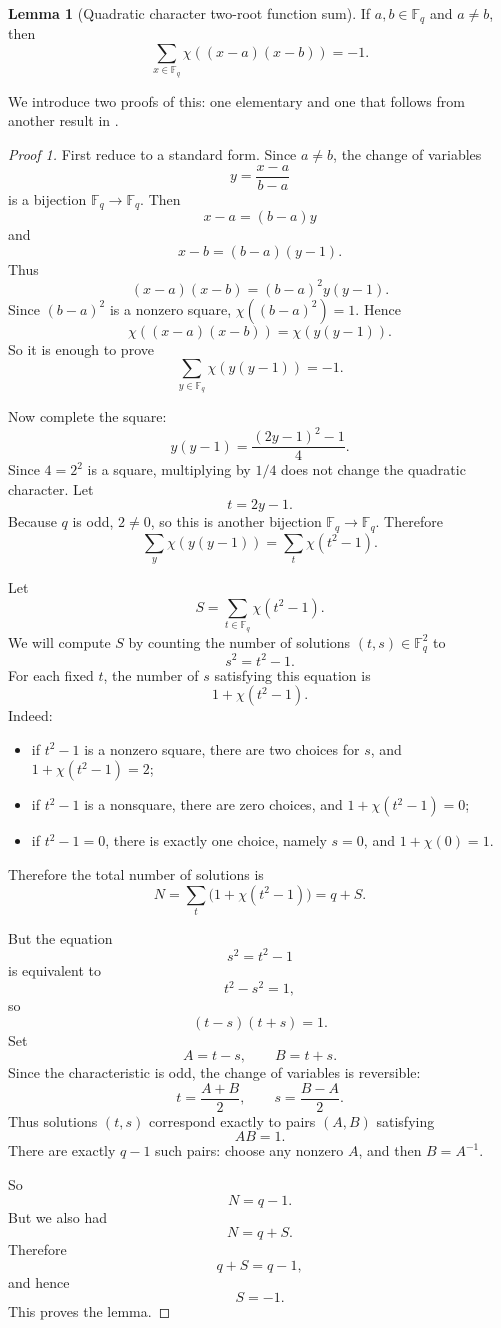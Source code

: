 \documentclass{article}
\newcommand{\F}{\mathbb F}
\theoremstyle{definition}
\newtheorem{lemma}{Lemma}
\numberwithin{equation}{section}
\begin{document}
\begin{lemma}[Quadratic character two-root function sum]
If \(a,b\in\F_q\) and \(a\neq b\), then
\[
\boxed{
\sum_{x\in\F_q}\chi((x-a)(x-b))=-1.
}
\]
\label{quadratic_sum}
\end{lemma}

We introduce two proofs of this: one elementary and one that follows from another result in \cite{LidlNiederreiterFiniteFields}.

\begin{proof}[Proof 1]
First reduce to a standard form. Since \(a\neq b\), the change of variables
\[
y=\frac{x-a}{b-a}
\]
is a bijection \(\F_q\to\F_q\). Then
\[
x-a=(b-a)y
\]
and
\[
x-b=(b-a)(y-1).
\]
Thus
\[
(x-a)(x-b)=(b-a)^2y(y-1).
\]
Since \((b-a)^2\) is a nonzero square, \(\chi((b-a)^2)=1\). Hence
\[
\chi((x-a)(x-b))=\chi(y(y-1)).
\]
So it is enough to prove
\[
\sum_{y\in\F_q}\chi(y(y-1))=-1.
\]

Now complete the square:
\[
y(y-1)=\frac{(2y-1)^2-1}{4}.
\]
Since \(4=2^2\) is a square, multiplying by \(1/4\) does not change the quadratic character. Let
\[
t=2y-1.
\]
Because \(q\) is odd, \(2\neq0\), so this is another bijection \(\F_q\to\F_q\). Therefore
\[
\sum_y \chi(y(y-1))
=
\sum_t \chi(t^2-1).
\]

Let
\[
S=\sum_{t\in\F_q}\chi(t^2-1).
\]
We will compute \(S\) by counting the number of solutions \((t,s)\in\F_q^2\) to
\[
s^2=t^2-1.
\]
For each fixed \(t\), the number of \(s\) satisfying this equation is
\[
1+\chi(t^2-1).
\]
Indeed:
\begin{itemize}
    \item if \(t^2-1\) is a nonzero square, there are two choices for \(s\), and \(1+\chi(t^2-1)=2\);
    \item if \(t^2-1\) is a nonsquare, there are zero choices, and \(1+\chi(t^2-1)=0\);
    \item if \(t^2-1=0\), there is exactly one choice, namely \(s=0\), and \(1+\chi(0)=1\).
\end{itemize}
Therefore the total number of solutions is
\[
N=\sum_t\bigl(1+\chi(t^2-1)\bigr)=q+S.
\]

But the equation
\[
s^2=t^2-1
\]
is equivalent to
\[
t^2-s^2=1,
\]
so
\[
(t-s)(t+s)=1.
\]
Set
\[
A=t-s,
\qquad
B=t+s.
\]
Since the characteristic is odd, the change of variables is reversible:
\[
t=\frac{A+B}{2},
\qquad
s=\frac{B-A}{2}.
\]
Thus solutions \((t,s)\) correspond exactly to pairs \((A,B)\) satisfying
\[
AB=1.
\]
There are exactly \(q-1\) such pairs: choose any nonzero \(A\), and then \(B=A^{-1}\).

So
\[
N=q-1.
\]
But we also had
\[
N=q+S.
\]
Therefore
\[
q+S=q-1,
\]
and hence
\[
S=-1.
\]
This proves the lemma.
\end{proof}
\end{document}
